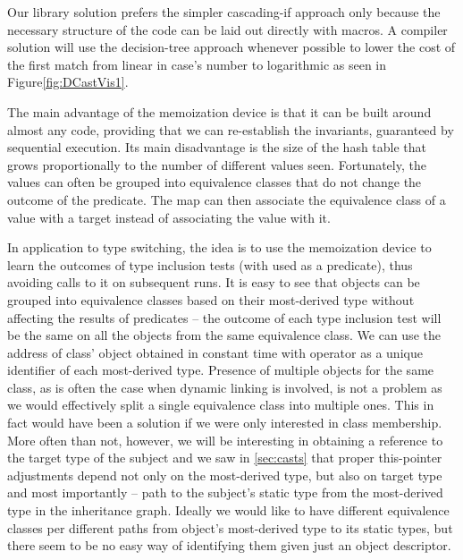 \noindent
Our library solution prefers the simpler cascading-if approach only because the necessary 
structure of the code can be laid out directly with macros. A compiler solution 
will use the decision-tree approach whenever possible to lower the cost of the 
first match from linear in case's number to logarithmic as seen in Figure\ref{fig:DCastVis1}.


The main advantage of the memoization device is that it can be built around 
almost any code, providing that we can re-establish the invariants, guaranteed 
by sequential execution. Its main disadvantage is the size of the hash table 
that grows proportionally to the number of different values seen. Fortunately, 
the values can often be grouped into equivalence classes that do not change the 
outcome of the predicate. The map can then associate the equivalence class of a 
value with a target instead of associating the value with it. 

In application to type switching, the idea is to use the memoization device to 
learn the outcomes of type inclusion tests (with  used as a predicate), 
thus avoiding calls to it on subsequent runs. It is easy to see that objects can 
be grouped into equivalence classes based on their most-derived type without 
affecting the results of predicates -- the outcome of each type inclusion test will be the 
same on all the objects from the same equivalence class. We can use the 
address of class'  object obtained in constant time with 
 operator as a unique identifier of each most-derived type. 
Presence of multiple  objects for the same class, as is often 
the case when dynamic linking is involved, is not a problem as we would 
effectively split a single equivalence class into multiple ones. This in fact 
would have been a solution if we were only interested in class membership. More 
often than not, however, we will be interesting in obtaining a reference to the  
target type of the subject and we saw in \textsection\ref{sec:casts} that proper 
this-pointer adjustments depend not only on the most-derived type, but also on 
target type and most importantly -- path to the subject's static type from the 
most-derived type in the inheritance graph. Ideally we would like to have 
different equivalence classes per different paths from object's most-derived 
type to its static types, but there seem to be no easy way of identifying them 
given just an object descriptor.

